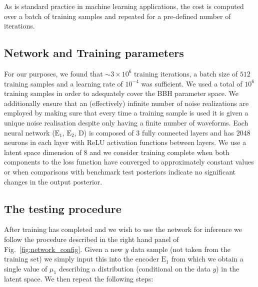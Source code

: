 \documentclass[%
showpacs,
 amsmath,amssymb,
 aps,
 twocolumn,
 prl,
 reprint,
floatfix,
]{revtex4-1}
\newcommand{\chris}[1]{\textbf{\textcolor{red}{CHRIS: #1}}}
\begin{document}
%
%
As is standard practice in machine learning applications, the cost
is computed over a batch of training samples and repeated for a pre-defined
number of iterations. 


\subsection{Network and Training parameters}
%
%
For our purposes, we found that $\sim3\times10^6$ training iterations, a batch
size of $512$ training samples and a learning rate of $10^{-4}$ was sufficient.
We used a total of $10^6$ training samples in order to adequately cover the
\ac{BBH} parameter space. We additionally ensure that an (effectively)
infinite number of noise realizations are employed by making sure that every
time a training sample is used it is given a unique noise realisation despite
only having a finite number of waveforms. Each neural network
($\text{E}_1$, $\text{E}_2$, D) is composed of 3 fully connected layers and has
$2048$ neurons in each layer with ReLU activation functions between layers. We
use a latent space dimension of $8$ and we consider training complete when
both components to the loss function have converged to approximately constant
values or when comparisons with benchmark test posteriors indicate no
significant changes in the output posterior.

\subsection{The testing procedure}
%
%
%
After training has completed and we wish to use the network for inference we
follow the procedure described in the right hand panel of
Fig.~\ref{fig:network_config}. Given a new $y$ data sample (not taken from the
training set) we simply input this into the encoder $\textrm{E}_1$ from which we
obtain a single value of $\mu_{1}$ describing a distribution (conditional on the
data $y$) in the latent space. We then repeat the following steps:
\end{document}

